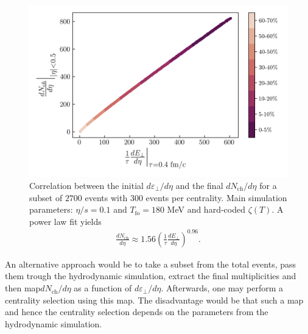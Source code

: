 \begin{figure}[!hbt]
	\includegraphics[width=\textwidth]{images/dnch_etot_bulk.png}
	\caption{\normalsize Correlation between the initial $d\varepsilon_\perp/d\eta$ and the final $dN_\mathrm{ch}/d\eta$ for a subset of $2700$ events with $300$ events per centrality. Main simulation parameters: $\eta/s=0.1$ and $T_\mathrm{fo}=180$ MeV and hard-coded $\zeta(T)$. A power law fit yields
	\begin{align*}
	    \frac{dN_\text{ch}}{d\eta}\approx 1.56 \left(\frac{1}{\tau}\frac{dE_\perp}{d\eta}\right)^{0.96}.
	\end{align*}
	} 
\end{figure}

An alternative approach \cite{mcdonaldhydro} would be to take a subset from the total events, pass them trough the hydrodynamic simulation, extract the final multiplicities and then map$dN_\text{ch}/d\eta$ as a function of $d\varepsilon_\perp/d\eta$. Afterwards, one may perform a centrality selection using this map. The disadvantage would be that such a map and hence the centrality selection depends on the parameters from the hydrodynamic simulation. 
